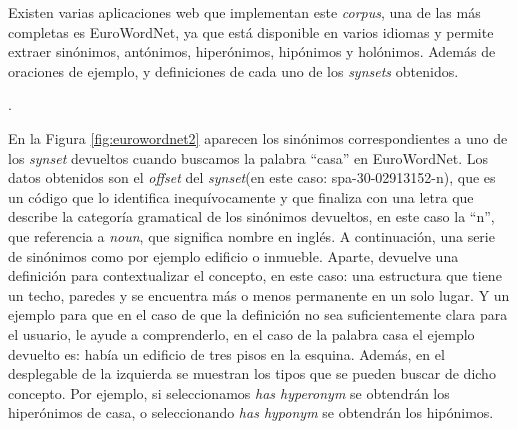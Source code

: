 Existen varias aplicaciones web que implementan este \textit{corpus}, una de las más completas es EuroWordNet, ya que está disponible en varios idiomas y permite extraer sinónimos, antónimos, hiperónimos, hipónimos y holónimos. Además de oraciones de ejemplo, y definiciones de cada uno de los \textit{synsets} obtenidos.


.

En la Figura \ref{fig:eurowordnet2} aparecen los sinónimos correspondientes a uno de los \textit{synset} devueltos cuando buscamos la palabra ``casa'' en EuroWordNet. Los datos obtenidos son el \textit{offset} del \textit{synset}(en este caso: spa-30-02913152-n), que es un código que lo identifica inequívocamente y que finaliza con una letra que describe la categoría gramatical de los sinónimos devueltos, en este caso la ``n'', que referencia a \textit{noun}, que significa nombre en inglés. A continuación, una serie de sinónimos como por ejemplo edificio o inmueble. Aparte, devuelve una definición para contextualizar el concepto, en este caso: una estructura que tiene un techo, paredes y se encuentra más o menos permanente en un solo lugar. Y un ejemplo para que en el caso de que la definición no sea suficientemente clara para el usuario, le ayude a comprenderlo, en el caso de la palabra casa el ejemplo devuelto es: había un edificio de tres pisos en la esquina. Además, en el desplegable de la izquierda se muestran los tipos que se pueden buscar de dicho concepto. Por ejemplo, si seleccionamos \textit{has hyperonym} se obtendrán los hiperónimos de casa, o seleccionando \textit{has hyponym} se obtendrán los hipónimos.


